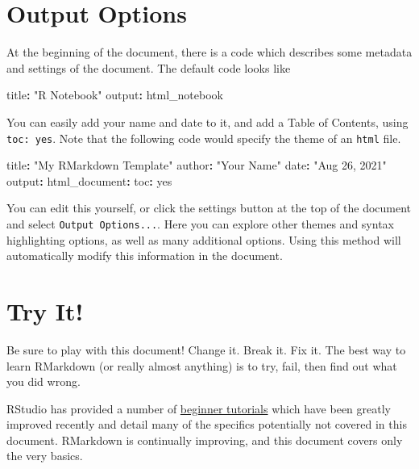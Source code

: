 \documentclass[
]{book}
\newenvironment{Shaded}{\begin{snugshade}}{\end{snugshade}}
\newcommand{\NormalTok}[1]{#1}
\newcommand{\SpecialCharTok}[1]{\textcolor[rgb]{0.81,0.36,0.00}{\textbf{#1}}}
\newcommand{\StringTok}[1]{\textcolor[rgb]{0.31,0.60,0.02}{#1}}
\theoremstyle{definition}
\theoremstyle{definition}
\theoremstyle{definition}
\theoremstyle{definition}
\theoremstyle{remark}
\begin{document}
\hypertarget{output-options}{%
\section{Output Options}\label{output-options}}

At the beginning of the document, there is a code which describes some metadata and settings of the document. The default code looks like

\begin{Shaded}
\begin{Highlighting}[]
\NormalTok{    title}\SpecialCharTok{:} \StringTok{"R Notebook"}
\NormalTok{    output}\SpecialCharTok{:}\NormalTok{ html\_notebook}
\end{Highlighting}
\end{Shaded}

You can easily add your name and date to it, and add a Table of Contents, using \texttt{toc:\ yes}. Note that the following code would specify the theme of an \texttt{html} file.

\begin{Shaded}
\begin{Highlighting}[]
\NormalTok{    title}\SpecialCharTok{:} \StringTok{"My RMarkdown Template"}
\NormalTok{    author}\SpecialCharTok{:} \StringTok{"Your Name"}
\NormalTok{    date}\SpecialCharTok{:} \StringTok{"Aug 26, 2021"}
\NormalTok{    output}\SpecialCharTok{:}
\NormalTok{      html\_document}\SpecialCharTok{:} 
\NormalTok{        toc}\SpecialCharTok{:}\NormalTok{ yes}
\end{Highlighting}
\end{Shaded}

You can edit this yourself, or click the settings button at the top of the document and select \texttt{Output\ Options...}. Here you can explore other themes and syntax highlighting options, as well as many additional options. Using this method will automatically modify this information in the document.

\hypertarget{try-it}{%
\section{Try It!}\label{try-it}}

Be sure to play with this document! Change it. Break it. Fix it. The best way to learn RMarkdown (or really almost anything) is to try, fail, then find out what you did wrong.

RStudio has provided a number of \href{http://rmarkdown.rstudio.com/lesson-1.html}{beginner tutorials} which have been greatly improved recently and detail many of the specifics potentially not covered in this document. RMarkdown is continually improving, and this document covers only the very basics.
\end{document}
